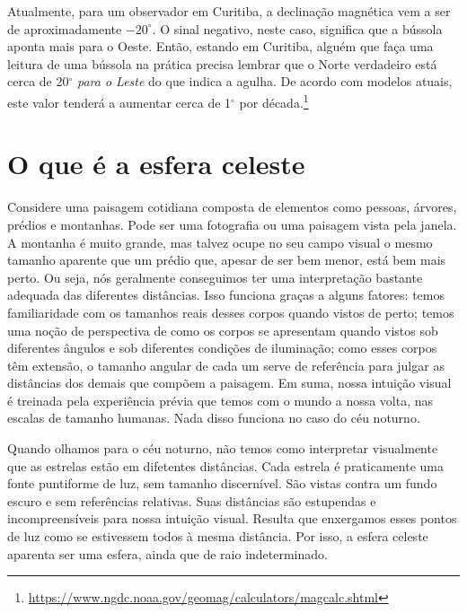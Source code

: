 Atualmente, para um observador em Curitiba, a declinação magnética vem a ser de aproximadamente $-20^{\circ}$. O sinal negativo, neste caso, significa que a bússola aponta mais para o Oeste. Então, estando em Curitiba, alguém que faça uma leitura de uma bússola na prática precisa lembrar que o Norte verdadeiro está cerca de 20$^{\circ}$ \textit{para o Leste} do que indica a agulha. De acordo com modelos atuais, este valor tenderá a aumentar cerca de 1$^{\circ}$ por década.\footnote{\url{https://www.ngdc.noaa.gov/geomag/calculators/magcalc.shtml}}


\section{O que é a esfera celeste}

Considere uma paisagem cotidiana composta de elementos como pessoas, árvores, prédios e montanhas. Pode ser uma fotografia ou uma paisagem vista pela janela. A montanha é muito grande, mas talvez ocupe no seu campo visual o mesmo tamanho aparente que um prédio que, apesar de ser bem menor, está bem mais perto. Ou seja, nós geralmente conseguimos ter uma interpretação bastante adequada das diferentes distâncias. Isso funciona graças a alguns fatores: temos familiaridade com os tamanhos reais desses corpos quando vistos de perto; temos uma noção de perspectiva de como os corpos se apresentam quando vistos sob diferentes ângulos e sob diferentes condições de iluminação; como esses corpos têm extensão, o tamanho angular de cada um serve de referência para julgar as distâncias dos demais que compõem a paisagem. Em suma, nossa intuição visual é treinada pela experiência prévia que temos com o mundo a nossa volta, nas escalas de tamanho humanas. Nada disso funciona no caso do céu noturno.

Quando olhamos para o céu noturno, não temos como interpretar visualmente que as estrelas estão em difetentes distâncias. Cada estrela é praticamente uma fonte puntiforme de luz, sem tamanho discernível. São vistas contra um fundo escuro e sem referências relativas. Suas distâncias são estupendas e incompreensíveis para nossa intuição visual. Resulta que enxergamos esses pontos de luz como se estivessem todos à mesma distância. Por isso, a esfera celeste aparenta ser uma esfera, ainda que de raio indeterminado.

